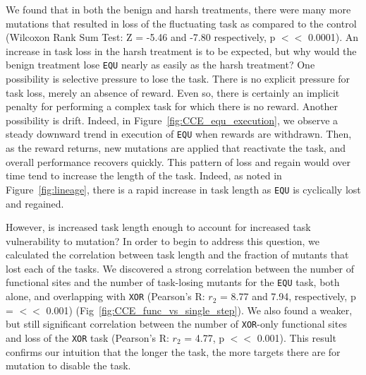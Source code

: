 \documentclass[PhD]{msu-thesis}
\begin{document}
We found that in both the benign and harsh treatments, there were many more mutations that resulted in loss of the fluctuating task as compared to the control (Wilcoxon Rank Sum Test: Z = -5.46 and -7.80 respectively, p $<<$ 0.0001). An increase in task loss in the harsh treatment is to be expected, but why would the benign treatment lose \texttt{EQU} nearly as easily as the harsh treatment? One possibility is selective pressure to lose the task. There is no explicit pressure for task loss, merely an absence of reward. Even so, there is certainly an implicit penalty for performing a complex task for which there is no reward. Another possibility is drift. Indeed, in Figure~\ref{fig:CCE_equ_execution}, we observe a steady downward trend in execution of \texttt{EQU} when rewards are withdrawn. Then, as the reward returns, new mutations are applied that reactivate the task, and overall performance recovers quickly. This pattern of loss and regain would over time tend to increase the length of the task. Indeed, as noted in Figure~\ref{fig:lineage}, there is a rapid increase in task length as \texttt{EQU} is cyclically lost and regained. 

However, is increased task length enough to account for increased task vulnerability to mutation? In order to begin to address this question, we calculated the correlation between task length and the fraction of mutants that lost each of the tasks. We discovered a strong correlation between the number of functional sites and the number of task-losing mutants for the \texttt{EQU} task, both alone, and overlapping with \texttt{XOR} (Pearson's R: $r_{2}$ = 8.77 and 7.94, respectively, p = $<<$ 0.001) (Fig~\ref{fig:CCE_func_vs_single_step}). We also found a weaker, but still significant correlation between the number of \texttt{XOR}-only functional sites and loss of the \texttt{XOR} task (Pearson's R: $r_{2}$ = 4.77, p $<<$ 0.001). This result confirms our intuition that the longer the task, the more targets there are for mutation to disable the task.
\end{document}
